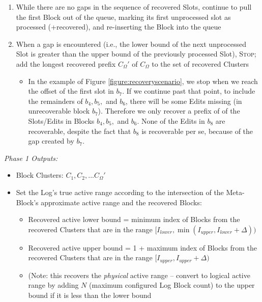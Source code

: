 \documentclass[11pt]{article}
\begin{document}
\begin{enumerate}
\begin{enumerate}
                  EditOffset of the first unprocessed Slot in the
                  Block
		\item While there are no gaps in the sequence of
                  recovered Slots, continue to pull the first Block
                  out of the queue, marking its first unprocessed slot
                  as processed (+recovered), and re-inserting the
                  Block into the queue
		\item When a gap is encountered (i.e., the lower bound
                  of the next unprocessed Slot is greater than the
                  upper bound of the previously processed Slot),
                  \textsc{Stop;} add the longest recovered prefix
                  $C_{\Omega}'$ of $C_{\Omega}$ to the set of
                  recovered Clusters
		\begin{itemize}
		    \item[] In the example of Figure
                      \ref{figure:recoveryscenario}, we stop when we
                      reach the offset of the first slot in $b_7$.  If
                      we continue past that point, to include the
                      remainders of $b_4, b_5,$ and $b_6$, there will
                      be some Edits missing (in unrecoverable block
                      $b_7$).  Therefore we only recover a prefix of
                      of the Slots/Edits in Blocks $b_4, b_5,$ and
                      $b_6$.  None of the Edits in $b_8$ are
                      recoverable, despite the fact that $b_8$ is
                      recoverable per se, because of the gap created
                      by $b_7$.
		\end{itemize}
	\end{enumerate}
\end{enumerate}

\textit{Phase 1 Outputs:}

\begin{itemize}
	\item Block Clusters: $C_1, C_2, ... C_{\Omega}'$
	\item Set the Log's true active range according to the
          intersection of the Meta-Block's approximate active range
          and the recovered Blocks:
	\begin{itemize}
		\item Recovered active lower bound = minimum index of
                  Blocks from the recovered Clusters that are in the
                  range $[I_{lower}, \min(I_{upper}, I_{lower} +
                    \Delta))$
		\item Recovered active upper bound = 1 + maximum index
                  of Blocks from the recovered Clusters that are in
                  the range $[I_{upper}, I_{upper}+\Delta)$
		\item (Note: this recovers the \textit{physical}
                  active range -- convert to logical active range by
                  adding $N$ (maximum configured Log Block count) to
                  the upper bound if it is less than the lower bound
	\end{itemize}
\end{itemize}
\end{document}

